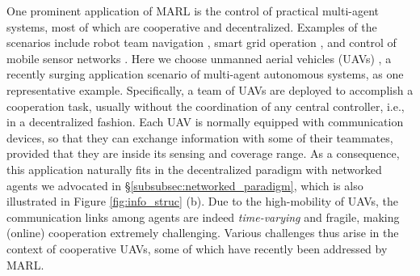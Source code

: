 One  prominent application of MARL is the control of practical multi-agent systems, most of which are cooperative and decentralized. 
Examples of the scenarios include  robot team navigation \cite{corke2005networked}, smart grid operation \cite{dall2013distributed}, and control of mobile sensor networks \cite{cortes2004coverage}. Here we choose  unmanned aerial vehicles (UAVs) \cite{yang2018keeping,pham2018cooperative,tovzivcka2018application,shamsoshoara2019distributed,cui2019application,qie2019joint}, a recently surging application scenario of multi-agent autonomous systems, as one representative example. 
 Specifically, a team of  UAVs are deployed to accomplish a cooperation task, usually without the coordination of any central controller, i.e., in a decentralized fashion. Each UAV is  normally equipped with communication devices, so that they can exchange information with some of  their  teammates, provided that they are  inside its sensing and coverage range. As a consequence, this application naturally fits in the decentralized paradigm with networked agents we advocated in \S\ref{subsubsec:networked_paradigm}, which is also illustrated in Figure  \ref{fig:info_struc} (b). Due to the high-mobility of UAVs, the communication links among agents are indeed \emph{time-varying} and fragile, making (online)  cooperation extremely challenging. 
Various challenges thus arise in the  context of cooperative UAVs, some of which have recently been  addressed by MARL. 


